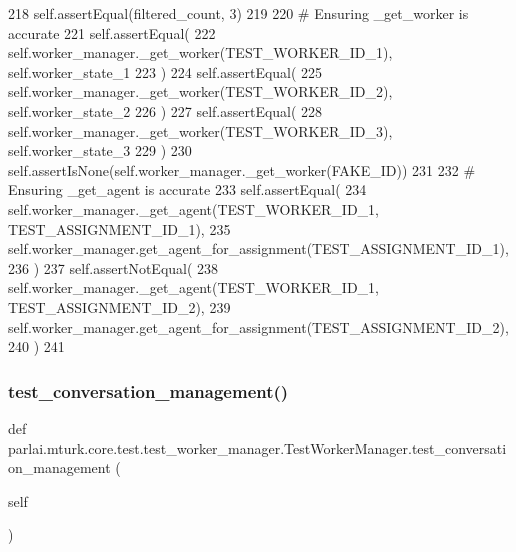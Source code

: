 \begin{DoxyCode}
218         self.assertEqual(filtered\_count, 3)
219 
220         \textcolor{comment}{# Ensuring \_get\_worker is accurate}
221         self.assertEqual(
222             self.worker\_manager.\_get\_worker(TEST\_WORKER\_ID\_1), self.worker\_state\_1
223         )
224         self.assertEqual(
225             self.worker\_manager.\_get\_worker(TEST\_WORKER\_ID\_2), self.worker\_state\_2
226         )
227         self.assertEqual(
228             self.worker\_manager.\_get\_worker(TEST\_WORKER\_ID\_3), self.worker\_state\_3
229         )
230         self.assertIsNone(self.worker\_manager.\_get\_worker(FAKE\_ID))
231 
232         \textcolor{comment}{# Ensuring \_get\_agent is accurate}
233         self.assertEqual(
234             self.worker\_manager.\_get\_agent(TEST\_WORKER\_ID\_1, TEST\_ASSIGNMENT\_ID\_1),
235             self.worker\_manager.get\_agent\_for\_assignment(TEST\_ASSIGNMENT\_ID\_1),
236         )
237         self.assertNotEqual(
238             self.worker\_manager.\_get\_agent(TEST\_WORKER\_ID\_1, TEST\_ASSIGNMENT\_ID\_2),
239             self.worker\_manager.get\_agent\_for\_assignment(TEST\_ASSIGNMENT\_ID\_2),
240         )
241 
\end{DoxyCode}
\mbox{\label{classparlai_1_1mturk_1_1core_1_1test_1_1test__worker__manager_1_1TestWorkerManager_a0cb9deb791925c2ae1ae32ca03a342a2}} 
\subsubsection{\texorpdfstring{test\+\_\+conversation\+\_\+management()}{test\_conversation\_management()}}
{\footnotesize\ttfamily def parlai.\+mturk.\+core.\+test.\+test\+\_\+worker\+\_\+manager.\+Test\+Worker\+Manager.\+test\+\_\+conversation\+\_\+management (\begin{DoxyParamCaption}\item[{}]{self }\end{DoxyParamCaption})}

